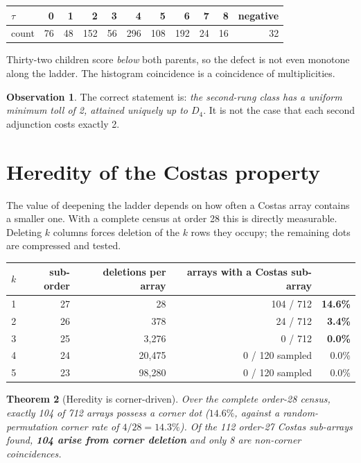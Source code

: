\documentclass[11pt,a4paper]{article}
\newtheorem{theorem}{Theorem}[section]
\theoremstyle{definition}
\newtheorem{observation}[theorem]{Observation}
\begin{document}
\begin{center}
\begin{tabular}{@{}lrrrrrrrrrr@{}}
\toprule
$\tau$ & 0 & 1 & 2 & 3 & 4 & 5 & 6 & 7 & 8 & negative \\
\midrule
count & 76 & 48 & 152 & 56 & 296 & 108 & 192 & 24 & 16 & 32 \\
\bottomrule
\end{tabular}
\end{center}

Thirty-two children score \emph{below} both parents, so the defect is not even
monotone along the ladder. The histogram coincidence is a coincidence of
multiplicities.

\begin{observation}
The correct statement is: \emph{the second-rung class has a uniform minimum toll
of 2, attained uniquely up to $D_4$}. It is not the case that each second
adjunction costs exactly 2.
\end{observation}

\section{Heredity of the Costas property}
\label{sec:heredity}

The value of deepening the ladder depends on how often a Costas array contains a
smaller one. With a complete census at order 28 this is directly measurable.
Deleting $k$ columns forces deletion of the $k$ rows they occupy; the remaining
dots are compressed and tested.

\begin{center}
\begin{tabular}{@{}rrrrr@{}}
\toprule
$k$ & sub-order & deletions per array & arrays with a Costas sub-array & \\
\midrule
1 & 27 & 28 & 104 / 712 & \textbf{14.6\%} \\
2 & 26 & 378 & 24 / 712 & \textbf{3.4\%} \\
3 & 25 & 3{,}276 & 0 / 712 & \textbf{0.0\%} \\
4 & 24 & 20{,}475 & 0 / 120 sampled & 0.0\% \\
5 & 23 & 98{,}280 & 0 / 120 sampled & 0.0\% \\
\bottomrule
\end{tabular}
\end{center}

\begin{theorem}[Heredity is corner-driven]
\label{thm:heredity}
Over the complete order-28 census, exactly 104 of 712 arrays possess a corner
dot ($14.6\%$, against a random-permutation corner rate of $4/28 = 14.3\%$). Of
the 112 order-27 Costas sub-arrays found, \textbf{104 arise from corner
deletion} and only 8 are non-corner coincidences.
\end{theorem}
\end{document}
